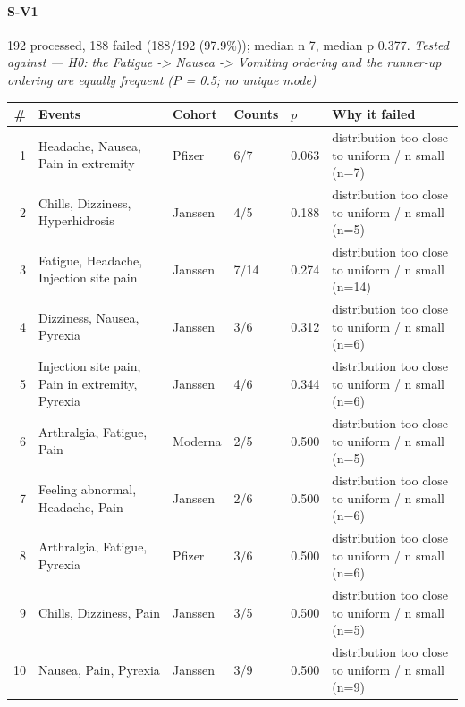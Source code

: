 \documentclass[11pt]{article}
\begin{document}
\paragraph{S-V1} 192 processed, 188 failed (188/192 (97.9\%)); median n 7, median p 0.377. \emph{Tested against --- H0: the Fatigue -> Nausea -> Vomiting ordering and the runner-up ordering are equally frequent (P = 0.5; no unique mode)} \\
\begin{longtable}{@{}r p{3.9cm} p{2.5cm} l l p{4.4cm}@{}}
\toprule
\# & Events & Cohort & Counts & $p$ & Why it failed \\
\midrule \endhead
1 & Headache, Nausea, Pain in extremity & Pfizer & 6/7 & 0.063 & distribution too close to uniform / n small (n=7) \\
2 & Chills, Dizziness, Hyperhidrosis & Janssen & 4/5 & 0.188 & distribution too close to uniform / n small (n=5) \\
3 & Fatigue, Headache, Injection site pain & Janssen & 7/14 & 0.274 & distribution too close to uniform / n small (n=14) \\
4 & Dizziness, Nausea, Pyrexia & Janssen & 3/6 & 0.312 & distribution too close to uniform / n small (n=6) \\
5 & Injection site pain, Pain in extremity, Pyrexia & Janssen & 4/6 & 0.344 & distribution too close to uniform / n small (n=6) \\
6 & Arthralgia, Fatigue, Pain & Moderna & 2/5 & 0.500 & distribution too close to uniform / n small (n=5) \\
7 & Feeling abnormal, Headache, Pain & Janssen & 2/6 & 0.500 & distribution too close to uniform / n small (n=6) \\
8 & Arthralgia, Fatigue, Pyrexia & Pfizer & 3/6 & 0.500 & distribution too close to uniform / n small (n=6) \\
9 & Chills, Dizziness, Pain & Janssen & 3/5 & 0.500 & distribution too close to uniform / n small (n=5) \\
10 & Nausea, Pain, Pyrexia & Janssen & 3/9 & 0.500 & distribution too close to uniform / n small (n=9) \\
\bottomrule
\end{longtable}
\end{document}
